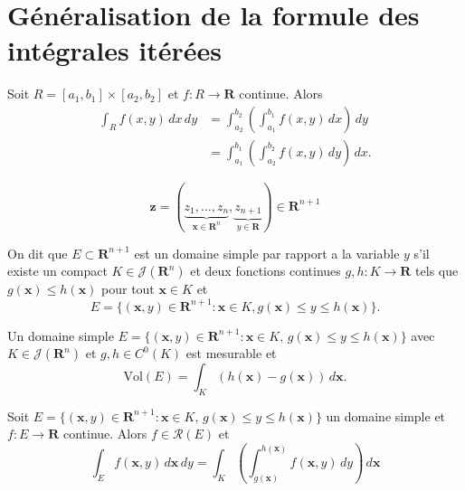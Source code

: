 \section{Généralisation de la formule des intégrales itérées}
Soit $R=[a_{1},b_{1}]\times[a_{2},b_{2}]$ et $f:R\to \mathbf{R}$ continue. Alors
\begin{align*}
\int _{R}f(x,y)\,dx\,dy & =\int_{a_{2}}^{b_{2}} \left( \int_{a_{1}}^{b_{1}} f(x,y) \, dx  \right) \, dy \\
 &  =\int_{a_{1}}^{b_{1}} \left( \int_{a_{2}}^{b_{2}} f(x,y) \, dy  \right) \, dx .
\end{align*}
\begin{notation}
$$
\boldsymbol{z}=(\underbrace{ z_{1},\dots,z_{n} }_{ \boldsymbol{x}\in \mathbf{R}^{n} },\underbrace{ z_{n+1} }_{ y\in \mathbf{R} })\in \mathbf{R}^{n+1}
$$
\end{notation}
\begin{definition}
On dit que $E\subset \mathbf{R}^{n+1}$ est un domaine simple par rapport a la variable $y$ s'il existe un compact $K\in \mathcal{J}(\mathbf{R}^{n})$ et deux fonctions continues $g,h:K\to \mathbf{R}$ tels que $g(\boldsymbol{x})\le h(\boldsymbol{x})$ pour tout $\boldsymbol{x}\in K$ et 
$$
E=\{ (\boldsymbol{x},y)\in \mathbf{R}^{n+1}:\boldsymbol{x}\in K, g(\boldsymbol{x})\le y \le h(\boldsymbol{x}) \}.
$$
\end{definition}
\begin{theorem}
Un domaine simple $E=\{ (\boldsymbol{x},y)\in \mathbf{R}^{n+1}:\boldsymbol{x}\in K,\, g(\boldsymbol{x})\le y \le h(\boldsymbol{x}) \}$ avec $K\in \mathcal{J}(\mathbf{R}^{n})$ et $g,h\in C^{0}(K)$ est mesurable et 
$$
\mathrm{Vol}(E)=\int _{K}(h(\boldsymbol{x})-g(\boldsymbol{x}))\,d\boldsymbol{x}.
$$
\end{theorem}
\begin{theorem}
Soit $E=\{ (\boldsymbol{x},y)\in \mathbf{R}^{n+1}:\boldsymbol{x}\in K,\,g(\boldsymbol{x})\le y \le h(\boldsymbol{x}) \}$ un domaine simple et $f:E\to \mathbf{R}$ continue. Alors $f\in \mathcal{R}(E)$ et 
$$
\int _{E}f(\boldsymbol{x},y)\,d\boldsymbol{x}\,dy=\int _{K}\left( \int_{g(\boldsymbol{x})}^{h(\boldsymbol{x})} f(\boldsymbol{x},y) \, dy  \right) \, d\boldsymbol{x} 
$$
\end{theorem}
